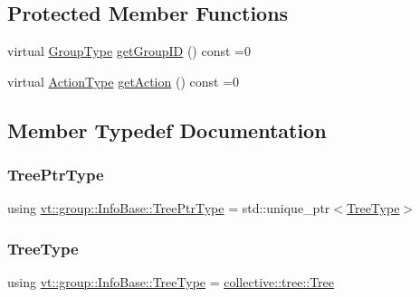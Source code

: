 \subsection*{Protected Member Functions}
\begin{DoxyCompactItemize}
\item 
virtual \hyperlink{namespacevt_a27b5e4411c9b6140c49100e050e2f743}{Group\+Type} \hyperlink{structvt_1_1group_1_1_info_base_afbb8a9919c924c50be2b99e2dc7cbca2}{get\+Group\+ID} () const =0
\item 
virtual \hyperlink{namespacevt_ae0a5a7b18cc99d7b732cb4d44f46b0f3}{Action\+Type} \hyperlink{structvt_1_1group_1_1_info_base_a643adfea212db8b896b201832bed0445}{get\+Action} () const =0
\end{DoxyCompactItemize}


\subsection{Member Typedef Documentation}
\mbox{\label{structvt_1_1group_1_1_info_base_af1111ac71e1ee7a009f00ebece27c3a3}} 
\subsubsection{\texorpdfstring{Tree\+Ptr\+Type}{TreePtrType}}
{\footnotesize\ttfamily using \hyperlink{structvt_1_1group_1_1_info_base_af1111ac71e1ee7a009f00ebece27c3a3}{vt\+::group\+::\+Info\+Base\+::\+Tree\+Ptr\+Type} =  std\+::unique\+\_\+ptr$<$\hyperlink{structvt_1_1group_1_1_info_base_a96e01b6097ed7b2bc299027d0a7a1b1e}{Tree\+Type}$>$}

\mbox{\label{structvt_1_1group_1_1_info_base_a96e01b6097ed7b2bc299027d0a7a1b1e}} 
\subsubsection{\texorpdfstring{Tree\+Type}{TreeType}}
{\footnotesize\ttfamily using \hyperlink{structvt_1_1group_1_1_info_base_a96e01b6097ed7b2bc299027d0a7a1b1e}{vt\+::group\+::\+Info\+Base\+::\+Tree\+Type} =  \hyperlink{structvt_1_1collective_1_1tree_1_1_tree}{collective\+::tree\+::\+Tree}}

